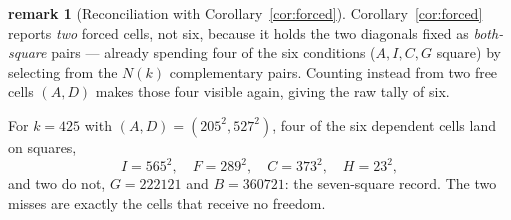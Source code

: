 \documentclass[11pt]{article}
\theoremstyle{definition}
\newtheorem{remark}{remark}
\begin{document}
\begin{remark}[Reconciliation with Corollary~\ref{cor:forced}]
Corollary~\ref{cor:forced} reports \emph{two} forced cells, not six, because it holds
the two diagonals fixed as \emph{both-square} pairs --- already spending four of the
six conditions ($A,I,C,G$ square) by selecting from the $N(k)$ complementary pairs.
Counting instead from two free cells $(A,D)$ makes those four visible again, giving the
raw tally of six.
\end{remark}

\noindent For $k=425$ with $(A,D)=(205^{2},527^{2})$, four of the six dependent cells
land on squares,
\[
  I=565^{2},\quad F=289^{2},\quad C=373^{2},\quad H=23^{2},
\]
and two do not, $G=222121$ and $B=360721$: the seven-square record. The two misses are
exactly the cells that receive no freedom.
\end{document}
